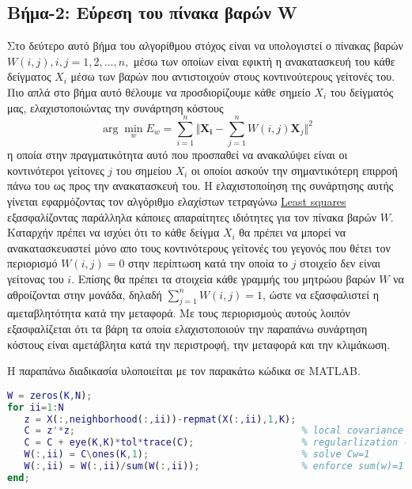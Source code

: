 \subsection{Βήμα-2: Εύρεση του πίνακα βαρών \textlatin{W}}
\par
Στο δεύτερο αυτό βήμα του αλγορίθμου στόχος είναι να υπολογιστεί ο πίνακας βαρών $W(i,j),i,j=1,2,\ldots,n,$ μέσω των οποίων είναι εφικτή η ανακατασκευή του κάθε δείγματος $X_{i}$ μέσω των βαρών που αντιστοιχούν στους κοντινούτερους γείτονές του. Πιο απλά στο βήμα αυτό θέλουμε να προσδιορίζουμε κάθε σημείο $X_{i}$ του δείγματός μας, ελαχιστοποιώντας την συνάρτηση κόστους
\newline\hspace*{\fill}
\begin{equation}
        \arg \min_{w} E_{w} = \sum_{i=1}^{n} \Vert \mathbf{X_{i}} - \sum_{j=1}^{n} W(i,j)\mathbf{X}_{j} \Vert ^{2}
\end{equation}
\hspace*{\fill}\newline
η οποία στην πραγματικότητα αυτό που προσπαθεί να ανακαλύψει είναι οι κοντινότεροι γείτονες $j$ του σημείου $X_{i}$ οι οποίοι ασκούν την σημαντικότερη επιρροή πάνω του ως προς την ανακατασκευή του. Η ελαχιστοποίηση της συνάρτησης αυτής γίνεται εφαρμόζοντας τον αλγόριθμο ελαχίστων τετραγώνω \href{https://en.wikipedia.org/wiki/Least_squares}{\textlatin{Least squares}} εξασφαλίζοντας παράλληλα κάποιες απαραίτητες ιδιότητες για τον πίνακα βαρών $W$. Καταρχήν πρέπει να ισχύει ότι το κάθε δείγμα $X_{i}$ θα πρέπει να μπορεί να ανακατασκευαστεί μόνο απο τους κοντινότερους γείτονές του γεγονός που θέτει τον περιορισμό $W(i,j)=0$ στην περίπτωση κατά την οποία το $j$ στοιχείο δεν είναι γείτονας του $i$. Επίσης θα πρέπει τα στοιχεία κάθε γραμμής του μητρώου βαρών $W$ να αθροίζονται στην μονάδα, δηλαδή $\sum_{j=1}^{n} W(i,j)=1$, ώστε να εξασφαλιστεί η αμεταβλητότητα κατά την μεταφορά. Με τους περιορισμούς αυτούς λοιπόν εξασφαλίζεται ότι τα βάρη τα οποία ελαχιστοποιούν την παραπάνω συνάρτηση κόστους είναι αμετάβλητα κατά την περιστροφή, την μεταφορά και την κλιμάκωση.
\par
Η παραπάνω διαδικασία υλοποιείται με τον παρακάτω κώδικα σε 
\textlatin{MATLAB}.
\begin{lstlisting}[language=Matlab]
W = zeros(K,N);
for ii=1:N
   z = X(:,neighborhood(:,ii))-repmat(X(:,ii),1,K); 
   C = z'*z;                                        % local covariance
   C = C + eye(K,K)*tol*trace(C);                   % regularlization (K>D)
   W(:,ii) = C\ones(K,1);                           % solve Cw=1
   W(:,ii) = W(:,ii)/sum(W(:,ii));                  % enforce sum(w)=1
end;
\end{lstlisting}
